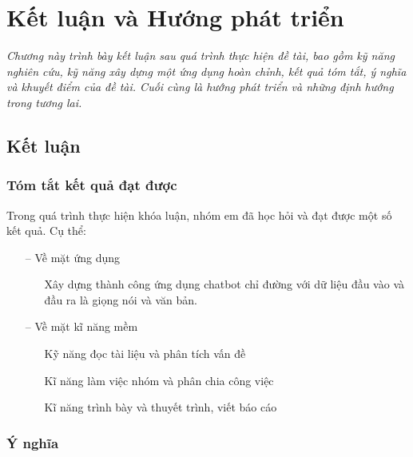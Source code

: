 \chapter{Kết luận và Hướng phát triển}
\label{Chapter6}

\emph{Chương này trình bày kết luận sau quá trình thực hiện đề tài, bao gồm kỹ năng nghiên cứu, kỹ năng xây dựng một ứng dụng hoàn chỉnh, kết quả tóm tắt, ý nghĩa và khuyết điểm của đề tài. Cuối cùng là hướng phát triển và những định hướng trong tương lai.}

\section{Kết luận}
\label{sec:ket-luan}

\subsection{Tóm tắt kết quả đạt được}

Trong quá trình thực hiện khóa luận, nhóm em đã học hỏi và đạt được một số kết quả. Cụ thể:

\begin{itemize}
    \item[--] Về mặt ứng dụng
        \begin{itemize}
            \item[\textbullet] Xây dựng thành công ứng dụng chatbot chỉ đường với dữ liệu đầu vào và đầu ra là giọng nói và văn bản.
        \end{itemize}
    \item[--] Về mặt kĩ năng mềm
        \begin{itemize}
            \item[\textbullet] Kỹ năng đọc tài liệu và phân tích vấn đề
            \item[\textbullet] Kĩ năng làm việc nhóm và phân chia công việc
            \item[\textbullet] Kĩ năng trình bày và thuyết trình, viết báo cáo
        \end{itemize}
\end{itemize}

\subsection{Ý nghĩa}

